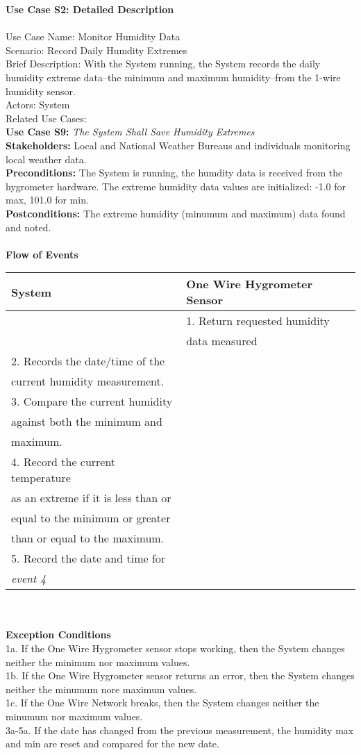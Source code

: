 \documentclass[letterpaper]{article}
\begin{document}
\noindent
\textbf{Use Case S2:  Detailed Description}\\\\
Use Case Name:  Monitor Humidity Data\\
Scenario:  Record Daily Humdity Extremes\\
Brief Description:  With the System running, the System records the
daily humidity extreme data--the minimum and maximum humidity--from
the 1-wire humidity sensor.\\
Actors:  System\\
Related Use Cases:\\
\textbf{Use Case S9:  }\emph{The System Shall Save Humidity
Extremes}\\
\textbf{Stakeholders:  }Local and National Weather Bureaus and
individuals monitoring local weather data.\\
\textbf{Preconditions:  }The System is running, the humdity data
is received from the hygrometer hardware. The extreme humidity
data values are initialized: -1.0 for max, 101.0 for min.\\
\textbf{Postconditions:  }The extreme humidity (minumum and
maximum) data
found and noted.\\\\
\textbf{Flow of Events}\\
\begin{tabular}{|l|l|}\hline
\textbf{System} & \textbf{One Wire Hygrometer Sensor}\\\hline
& 1.  Return requested humidity\\ 
&      data  measured\\\hline
2.    Records the date/time of the & \\
       current humidity  measurement. & \\\hline
3.     Compare the current humidity & \\
against both the minimum and & \\
maximum. &\\\hline
4.     Record the current temperature & \\
as an extreme if it is less than or & \\
equal to the minimum or greater & \\
than or equal to the maximum. & \\\hline
5.    Record the date and time for & \\
\emph{event 4} & \\\hline
\end{tabular}\\\\
\textbf{Exception Conditions}\\
1a.  If the One Wire Hygrometer sensor stops working, then the System
changes neither the minimum nor maximum values.\\
1b.  If the One Wire Hygrometer sensor returns an error, then the
System changes neither the minumum nore maximum values.\\
1c.  If the One Wire Network breaks, then the System changes neither
the minumum nor maximum values.\\
3a-5a.  If the date has changed from the previous measurement, the
humidity max and min are reset and compared for the new date.
\end{document}
